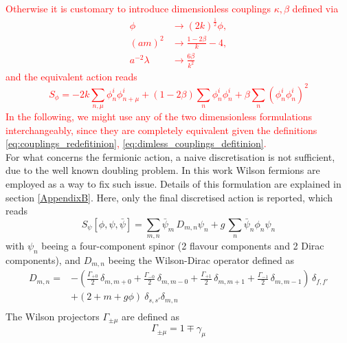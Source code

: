 \textcolor{red}{Otherwise it is customary to introduce dimensionless couplings $\kappa, \beta$ defined via
\begin{equation}
    \begin{aligned}
       \phi & \rightarrow(2 k)^{\frac{1}{2}} \phi, \\
        (a m)^2 & \rightarrow \frac{1-2 \beta}{k}-4, \\
        a^{-2} \lambda & \rightarrow \frac{6 \beta}{k^2}
    \end{aligned}
    \label{eq:dimless_couplings_defitinion}
\end{equation}
and the equivalent action reads
\begin{equation*}
    S_{\phi}=-2 k \sum_{n, \mu} \phi_n^i \phi_{n+\mu}^i+(1-2 \beta) \sum_n \phi_n^i \phi_n^i+\beta \sum_n\left(\phi_n^i \phi_n^i\right)^2
\end{equation*}
In the following, we might use any of the two dimensionless formulations interchangeably, since they are completely equivalent given the definitions \eqref{eq:couplings_redefitinion}, \eqref{eq:dimless_couplings_defitinion}.} \\
For what concerns the fermionic action, a naive discretisation is not sufficient, due to the well known doubling problem. In this work Wilson fermions are employed as a way to fix such issue. Details of this formulation are explained in section \ref{AppendixB}. Here, only the final discretised action is reported, which reads
\begin{equation*}
    S_\psi[\phi, \psi, \bar\psi] = \sum_{m,n} \bar\psi_m \, D_{m,n} \psi_n + g \, \sum_n \bar\psi_n \phi_n \psi_n
\end{equation*}
with $\psi_n$ beeing a four-component spinor (2 flavour components and 2 Dirac components), and $D_{m,n}$ beeing the Wilson-Dirac operator  defined as 
\begin{equation*}
    \begin{aligned}
    D_{m, n} = &- \left(\frac{\Gamma_{+0}}{2} \, \delta_{m, m+0} +\frac{\Gamma_{-0}}{2} \, \delta_{m, m-0} + \frac{\Gamma_{+1}}{2} \, \delta_{m, m+1} + \frac{\Gamma_{-1}}{2} \, \delta_{m, m-1}\right) \, \delta _{f, f'} \\
     &+ \left(2 + m + g\phi\right) \ \delta_{s,s'} \delta_{m,n} \\
    \end{aligned}
\end{equation*}
The Wilson projectors $\Gamma_{\pm \mu}$ are defined as
\begin{equation*}
    \Gamma_{\pm \mu} = 1 \mp \gamma_\mu 
\end{equation*}
